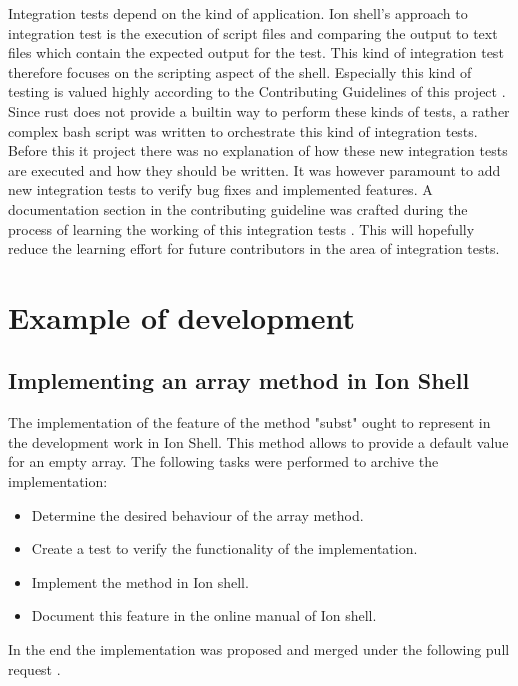 Integration tests depend on the kind of application.
Ion shell's approach to integration test is the execution of script files
and comparing the output to text files which contain the expected output for the test.
This kind of integration test therefore focuses on the scripting aspect of the shell.
Especially this kind of testing is valued highly according to the Contributing Guidelines of this project \cite{ion_shell_contributing}.
Since rust does not provide a builtin way to perform these kinds of tests,
a rather complex bash script was written to orchestrate this kind of integration tests.
Before this it project there was no explanation of how these new integration tests are executed and how they should be written.
It was however paramount to add new integration tests to verify bug fixes and implemented features.
A documentation section in the contributing guideline was crafted during the process of
learning the working of this integration tests \cite{ion_shell_contributing}.
This will hopefully reduce the learning effort for future contributors in the area of integration tests.

\section{Example of development}

\subsection{Implementing an array method in Ion Shell}

The implementation of the feature of the method "subst" ought to represent in the development work in Ion Shell.
This method allows to provide a default value for an empty array.
The following tasks were performed to archive the implementation:

\begin{itemize}
	\item Determine the desired behaviour of the array method.
	\item Create a test to verify the functionality of the implementation.
	\item Implement the method in Ion shell.
	\item Document this feature in the online manual of Ion shell.
\end{itemize}

In the end the implementation was proposed and merged under the following pull request \cite{pr_subst_method}.

